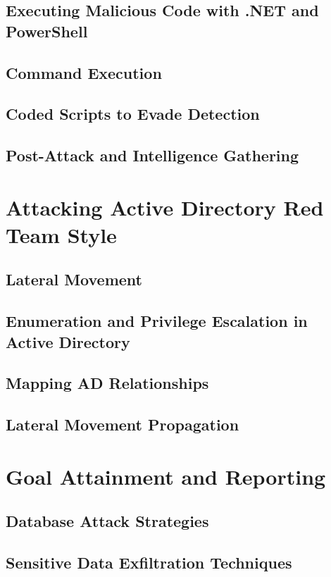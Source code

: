 \documentclass{article}
\begin{document}
\subsection{Executing Malicious Code with .NET and PowerShell}
\subsection{Command Execution}
\subsection{Coded Scripts to Evade Detection}
\subsection{Post-Attack and Intelligence Gathering}
\section{Attacking Active Directory Red Team Style}
\subsection{Lateral Movement}
\subsection{Enumeration and Privilege Escalation in Active Directory}
\subsection{Mapping AD Relationships}
\subsection{Lateral Movement Propagation}
\section{Goal Attainment and Reporting}
\subsection{Database Attack Strategies}
\subsection{Sensitive Data Exfiltration Techniques}
\end{document}
